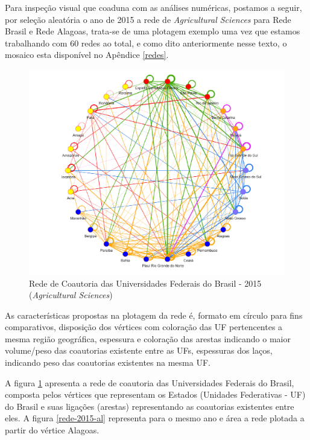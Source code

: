 Para inspeção visual que coaduna com as análises numéricas, postamos a seguir, por seleção aleatória o ano de 2015 a rede de \textit{Agricultural Sciences} para Rede Brasil e Rede Alagoas, trata-se de uma plotagem exemplo uma vez que estamos trabalhando com 60 redes ao total, e como dito anteriormente nesse texto, o mosaico esta disponível no Apêndice \ref{redes}.


\begin{figure}[H]
\centering
\includegraphics[scale=0.6]{Imagens/rede-agr-br-2015.pdf}
\caption{Rede de Coautoria das Universidades Federais do Brasil - 2015 (\textit{Agricultural Sciences})}
\label{rede-2015-br}
\end{figure}

As características propostas na plotagem da rede é, formato em círculo para fins comparativos, disposição dos vértices com coloração das UF pertencentes a mesma região geográfica, espessura e coloração das arestas indicando o maior volume/peso das coautorias existente entre as UFs, espessuras dos laços, indicando peso das coautorias existentes na mesma UF.

A figura \ref{rede-2015-br} apresenta a rede de coautoria das Universidades Federais do Brasil, composta pelos vértices que representam os Estados (Unidades Federativas - UF) do Brasil e suas ligações (arestas) representando as coautorias existentes entre eles. A figura \ref{rede-2015-al} representa para o mesmo ano e área a rede plotada a partir do vértice Alagoas.

